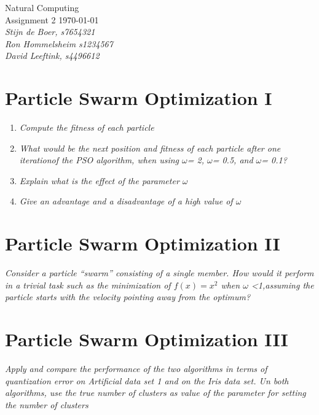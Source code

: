\documentclass{article}
\date{\today}
\begin{document}
\begin{flushright}
Natural Computing \\ 
Assignment 2 \today \\ 
\emph{Stijn de Boer, \textit{s7654321} \\ Ron Hommelsheim \textit{s1234567} \\  David Leeftink, \textit{s4496612} }\\\end{flushright}

\section{Particle Swarm Optimization I}

\begin{enumerate}[label=\alph*)]
    \item \textit{Compute the fitness of each particle} \\ 
    
    \item \textit{What would be the next position and fitness of each particle after one iterationof the PSO algorithm,  when using $\omega$= 2, $\omega$= 0.5, and $\omega$= 0.1?} \\
    
    \item \textit{Explain what is the effect of the parameter $\omega$} \\
    
    \item \textit{Give an advantage and a disadvantage of a high value of $\omega$} \\
    
\end{enumerate}
\section{Particle Swarm Optimization II}
\textit{Consider a particle “swarm” consisting of a single member. How would it perform in a trivial task such as the minimization of $f(x) =x^2$ when $\omega$ <1,assuming the particle starts with the velocity pointing away from the optimum?} \\ 


\section{Particle Swarm Optimization III}
\textit{Apply and compare the performance of the two algorithms in terms of quantization error  on  Artificial  data set  1  and  on  the  Iris  data set. Un both algorithms, use the true number of clusters as value of the parameter for setting the number of clusters}
\end{document}
